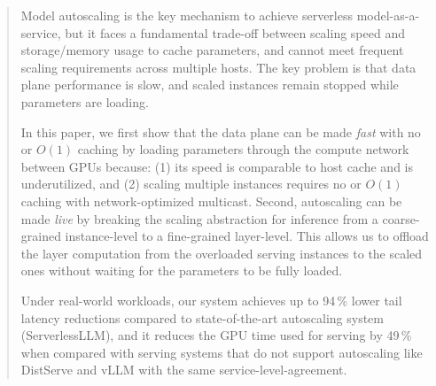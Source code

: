 \begin{abstract}
    \noindent
    Model autoscaling is the key mechanism to achieve serverless model-as-a-service, 
    but it faces a fundamental trade-off between scaling speed and storage/memory usage to cache parameters, 
    and cannot meet frequent scaling requirements across multiple hosts. 
    The key problem is that data plane performance is slow, 
    and scaled instances remain stopped while parameters are loading.     

    In this paper, we first show that the data plane
    can be made \emph{fast} with no or $O(1)$ caching
    by loading parameters through the compute network between GPUs because:
    (1) its speed is comparable to host cache and is underutilized, and
    (2) scaling multiple instances requires no or $O(1)$ caching with network-optimized multicast.
    Second, autoscaling can be made \emph{live} by
    breaking the scaling abstraction for inference
    from a coarse-grained instance-level to a fine-grained layer-level.
    This allows us to offload the layer computation from the overloaded serving instances
    to the scaled ones without waiting for the parameters to be fully loaded.

    
    Under real-world workloads,
    our system {\sys} achieves up to 94\,\% lower tail latency reductions compared to
    state-of-the-art autoscaling system (ServerlessLLM),
    and it reduces the GPU time used for serving by 49\,\% when compared with
    serving systems that do not support autoscaling like DistServe and vLLM with the same
    service-level-agreement.
\end{abstract}
